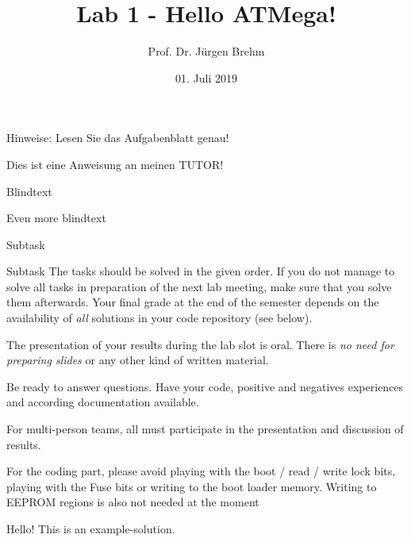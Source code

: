 \documentclass[11pt,globalcounting,tutor,solution,exam]{tutorial}
\title{Lab 1 - Hello ATMega!}
\institute{Institut für Systems Engineering}
\author{Prof. Dr. Jürgen Brehm}
\date{01. Juli 2019}
\begin{document}
Hinweise: Lesen Sie das Aufgabenblatt genau! 

\begin{tutornote}
Dies ist eine Anweisung an meinen TUTOR!
\end{tutornote}

\begin{task}{Blindtext}
\blindtext

\begin{subtask}[7]{Even more blindtext}
\blindtext
\end{subtask}

\begin{subtask}[5]{Subtask}
\blindtext
\end{subtask}

\begin{subtask}[5]{Subtask}
The tasks should be solved in the given order. If you do not manage to solve all tasks in preparation of the next lab meeting, make sure that you solve them afterwards. Your final grade at the end of the semester depends on the availability of \emph{all} solutions in your code repository (see below).

The presentation of your results during the lab slot is oral. There is \emph{no need for preparing slides} or any other kind of written material.

Be ready to answer questions. Have your code, positive and negatives experiences and according documentation available.

For multi-person teams, all must participate in the presentation and discussion of results.

For the coding part, please avoid playing with the boot / read / write lock bits, playing with the Fuse bits or writing to the boot loader memory. Writing to EEPROM regions is also not needed at the moment
\end{subtask}
\begin{solution}[3.5cm]
Hello!
This is an example-solution. 
\end{solution}
\end{task}
\end{document}
